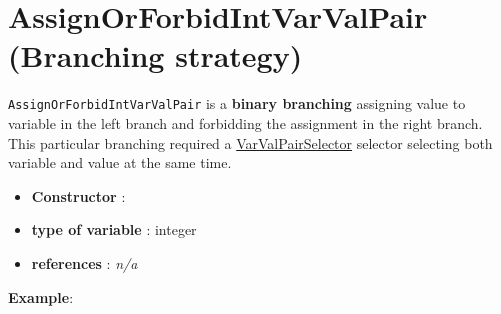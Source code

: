 \section{AssignOrForbidIntVarValPair (Branching strategy)}\label{assignorforbidintvarvalpair:assignorforbidintvarvalpairbranchstrat}\hypertarget{assignorforbidintvarvalpair:assignorforbidintvarvalpairbranchstrat}{}
\begin{notedef}
  \texttt{AssignOrForbidIntVarValPair} is a \textbf{binary branching} assigning value to variable in the left branch and forbidding the assignment in the right branch.  This particular branching required a \hyperlink{}{VarValPairSelector} selector selecting both variable and value at the same time.
\end{notedef}

\begin{itemize}
	\item \textbf{Constructor} :
	\item \textbf{type of variable} : integer
	\item \textbf{references} : \emph{n/a}
\end{itemize}

\textbf{Example}:
%

